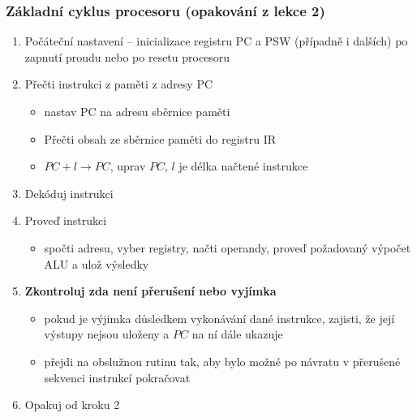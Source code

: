 \documentclass{beamer}
\begin{document}
\begin{frame}
\frametitle{Základní cyklus procesoru (opakování z lekce 2)}
\begin{enumerate}
  \item Počáteční nastavení -- inicializace registru PC a PSW (případně i dalších) po zapnutí proudu nebo po resetu procesoru
  \item Přečti instrukci z paměti z adresy PC
  \begin{itemize}
    \item nastav PC na adresu sběrnice paměti
    \item Přečti obsah ze sběrnice paměti do registru IR
    \item $PC+l \to PC$, uprav $PC$, $l$ je délka načtené instrukce
  \end{itemize}
  \item Dekóduj instrukci
  \item Proveď instrukci
  \begin{itemize}
    \item spočti adresu, vyber registry, načti operandy, proveď požadovaný výpočet ALU a ulož výsledky
  \end{itemize}
  \item \textbf{Zkontroluj zda není přerušení nebo vyjímka}
  \begin{itemize}
    \item pokud je výjimka důsledkem vykonávání dané instrukce, zajisti, že její výstupy nejsou uloženy a $PC$ na ní dále ukazuje
    \item přejdi na obslužnou rutinu tak, aby bylo možné po návratu v přerušené sekvenci instrukcí pokračovat
  \end{itemize}
  \item Opakuj od kroku 2
\end{enumerate}
\end{frame}
\end{document}
